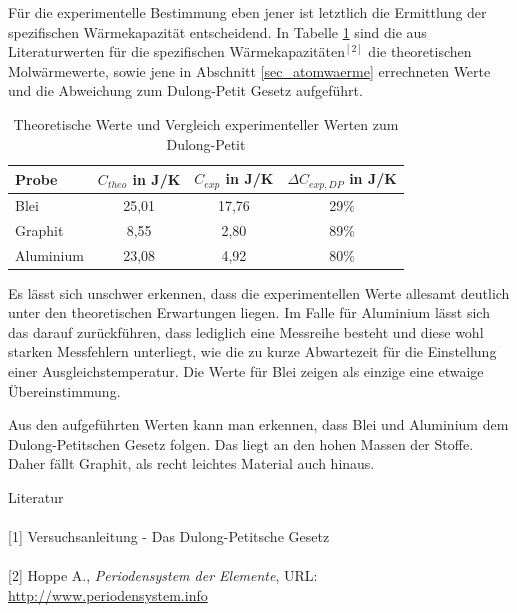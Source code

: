 Für die experimentelle Bestimmung eben jener ist letztlich die Ermittlung der spezifischen Wärmekapazität entscheidend. In Tabelle 
\ref{tab_diskussion} sind die aus Literaturwerten für die spezifischen Wärmekapazitäten$^{[2]}$ die theoretischen Molwärmewerte, sowie
jene in Abschnitt \ref{sec_atomwaerme} errechneten Werte und die Abweichung zum Dulong-Petit Gesetz aufgeführt.
\begin{table}[H]
 \begin{tabular}{l|c|c|c}
 Probe & $C_{theo}$ in J/K	& $C_{exp}$ in J/K & $\Delta C_{exp,DP}$ in J/K\\
 \hline
Blei	&25,01	&17,76	&29\% \\
Graphit	&8,55	&2,80	&89\% \\
Aluminium	&23,08	&4,92	&80\% 
 \end{tabular}
\caption{Theoretische Werte und Vergleich experimenteller Werten zum Dulong-Petit}
\label{tab_diskussion}
\end{table}

Es lässt sich unschwer erkennen, dass die experimentellen Werte allesamt deutlich unter den theoretischen Erwartungen liegen. Im Falle
für Aluminium lässt sich das darauf zurückführen, dass lediglich eine Messreihe besteht und diese wohl starken Messfehlern unterliegt,
wie die zu kurze Abwartezeit für die Einstellung einer Ausgleichstemperatur. Die Werte für Blei zeigen als einzige eine etwaige 
Übereinstimmung.

Aus den aufgeführten Werten kann man erkennen, dass Blei und Aluminium dem Dulong-Petitschen Gesetz folgen. Das liegt an den hohen Massen
der Stoffe. Daher fällt Graphit, als recht leichtes Material auch hinaus.

\parskip 400pt
\Large{Literatur}\\\\
\large{[1] Versuchsanleitung - Das Dulong-Petitsche Gesetz}\\\\
\large{[2] Hoppe A., \textit{Periodensystem der Elemente}, URL: \href{http://www.periodensystem.info}{http://www.periodensystem.info}}\\\\





